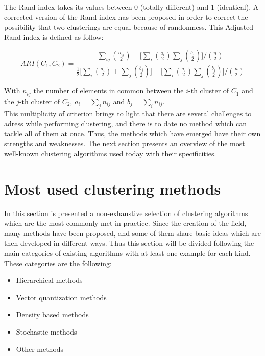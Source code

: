     The Rand index takes its values between 0 (totally different) and 1 (identical). A corrected version of the Rand index has been proposed in order to correct the possibility that two clusterings are equal because of randomness. This Adjusted Rand index is defined as follow:

    \begin{equation}
        ARI(C_1, C_2) = \frac{\sum_{ij}\binom{n_{ij}}{2} - \big[\sum_i\binom{a_i}{2}\sum_j\binom{b_j}{2}\big]/\binom{n}{2}}{\frac{1}{2}\big[\sum_i\binom{a_i}{2} + \sum_j\binom{b_j}{2}\big] - \big[\sum_i\binom{a_i}{2}\sum_j\binom{b_j}{2}\big]/\binom{n}{2}}
        \label{eq:adj_rand_index}
    \end{equation}

    With $n_{ij}$ the number of elements in common between the $i$-th cluster of $C_1$ and the $j$-th cluster of $C_2$, $a_i = \sum_j n_{ij}$ and $b_j = \sum_i n_{ij}$.\\

    This multiplicity of criterion brings to light that there are several challenges to adress while performing clustering, and there is to date no method which can tackle all of them at once. Thus, the methods which have emerged have their own strengths and weaknesses. The next section presents an overview of the most well-known clustering algorithms used today with their specificities.

    \section{Most used clustering methods}

    In this section is presented a non-exhaustive selection of clustering algorithms which are the most commonly met in practice. Since the creation of the field, many methods have been proposed, and some of them share basic ideas which are then developed in different ways. Thus this section will be divided following the main categories of existing algorithms with at least one example for each kind. These categories are the following:

    \begin{itemize}
        \item Hierarchical methods
        \item Vector quantization methods
        \item Density based methods
        \item Stochastic methods
        \item Other methods 
    \end{itemize}

